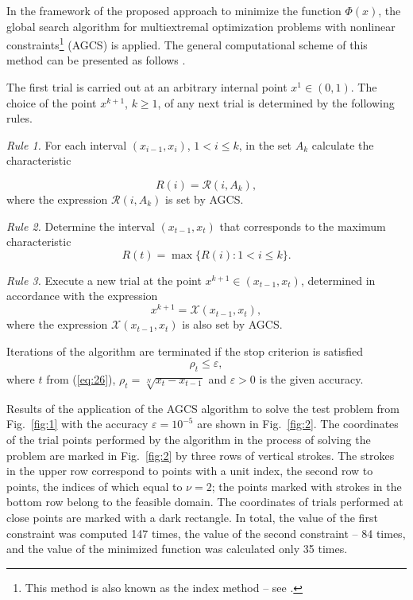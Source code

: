 \documentclass[smallextended]{svjour3}       %
\begin{document}
In the framework of the proposed approach to minimize the function $\Phi(x)$, the global search algorithm for multiextremal optimization problems with nonlinear constraints\footnote{This method is also known as the index method -- see \cite{c18}.} (AGCS) is applied. The general computational scheme of this method can be presented as follows \cite{c18}.

The first trial is carried out at an arbitrary internal point $x^1\in(0,1)$. The choice of the point $x^{k+1}$, $k \geq 1$, of any next trial is determined by the following rules.

\textit{Rule 1.} For each interval $(x_{i-1},x_i)$, $1 < i \leq k$, in the set $A_k$ calculate the characteristic

\begin{equation}\label{eq:25}
R(i)=\mathcal{R} (i,A_k),
\end{equation}
where the expression $\mathcal{R}(i,A_k)$ is set by AGCS.

\textit{Rule 2.} Determine the interval $(x_{t-1},x_t)$ that corresponds to the maximum characteristic
\begin{equation}\label{eq:26}
R(t) = \max{\{R(i):1 < i \leq k\}}.
\end{equation}

\textit{Rule 3.} Execute a new trial at the point $x^{k+1} \in (x_{t-1},x_t)$, determined in accordance with the expression
\begin{equation}\label{eq:27}
x^{k+1} = \mathcal{X}(x_{t-1},x_t),
\end{equation}
where the expression $\mathcal{X}(x_{t-1},x_t)$ is also set by AGCS.

Iterations of the algorithm are terminated if the stop criterion is satisfied
\begin{equation}\label{eq:28}
\rho_t\leq \varepsilon,
\end{equation}
where $t$ from (\ref{eq:26}), $\rho_t = \sqrt[N]{x_t-x_{t-1}}$ and $\varepsilon > 0$ is the given accuracy.

Results of the application of the AGCS algorithm to solve the test problem from Fig.~\ref{fig:1} with the accuracy $\varepsilon=10^{-5}$ are shown in Fig.~\ref{fig:2}. The coordinates of the trial points performed by the algorithm in the process of solving the problem are marked in Fig.~\ref{fig:2} by three rows of vertical strokes. The strokes in the upper row correspond to points with a unit index, the second row to points, the indices of which equal to $\nu=2$; the points marked with strokes in the bottom row belong to the feasible domain. The coordinates of trials performed at close points are marked with a dark rectangle. In total, the value of the first constraint was computed 147 times, the value of the second constraint -- 84 times, and the value of the minimized function was calculated only 35 times.
\end{document}
